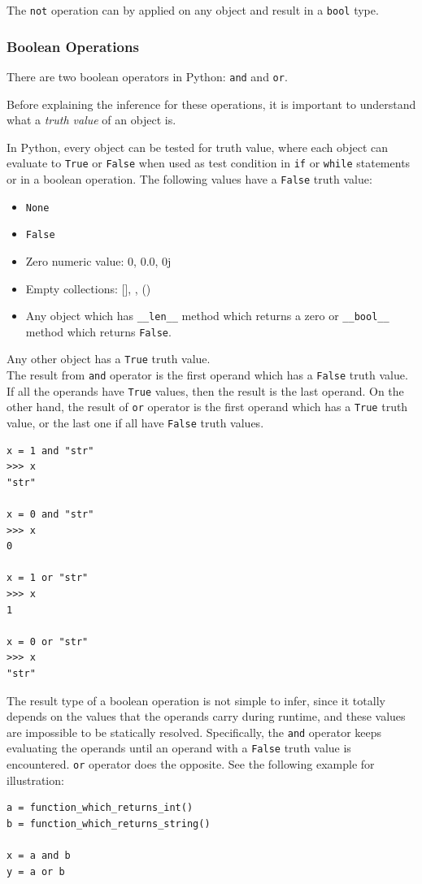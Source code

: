 The \lstinline|not| operation can by applied on any object and result in a \lstinline|bool| type.


\subsubsection{Boolean Operations}
There are two boolean operators in Python: \lstinline|and| and \lstinline|or|.

Before explaining the inference for these operations, it is important to understand what a \textit{truth value} of an object is.

In Python, every object can be tested for truth value, where each object can evaluate to \lstinline|True| or \lstinline|False| when used as test condition in \lstinline|if| or \lstinline|while| statements or in a boolean operation. The following values have a \lstinline|False| truth value:
\begin{itemize}
	\item \lstinline|None|
	\item \lstinline|False|
	\item Zero numeric value: 0, 0.0, 0j
	\item Empty collections: [], {}, ()
	\item Any object which has \lstinline|__len__| method which returns a zero or \lstinline|__bool__| method which returns \lstinline|False|.
\end{itemize}
Any other object has a \lstinline|True| truth value. \\

The result from \lstinline|and| operator is the first operand which has a \lstinline|False| truth value. If all the operands have \lstinline|True| values, then the result is the last operand. On the other hand, the result of \lstinline|or| operator is the first operand which has a \lstinline|True| truth value, or the last one if all have \lstinline|False| truth values.

\begin{lstlisting}
x = 1 and "str"
>>> x
"str"

x = 0 and "str"
>>> x
0

x = 1 or "str"
>>> x
1

x = 0 or "str"
>>> x
"str"
\end{lstlisting}

The result type of a boolean operation is not simple to infer, since it totally depends on the values that the operands carry during runtime, and these values are impossible to be statically resolved. Specifically, the \lstinline|and| operator keeps evaluating the operands until an operand with a \lstinline|False| truth value is encountered. \lstinline|or| operator does the opposite. See the following example for illustration:
\begin{lstlisting}
a = function_which_returns_int()
b = function_which_returns_string()

x = a and b
y = a or b
\end{lstlisting}

